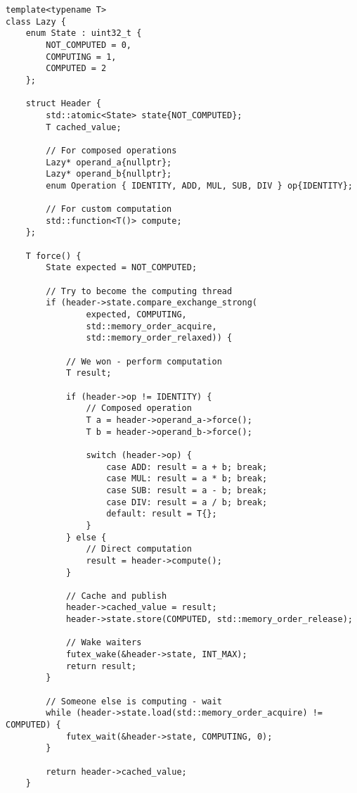 \documentclass[11pt]{article}
\begin{document}
\begin{lstlisting}[caption={Lazy Computation with Arithmetic Combinators}]
template<typename T>
class Lazy {
    enum State : uint32_t {
        NOT_COMPUTED = 0,
        COMPUTING = 1,
        COMPUTED = 2
    };
    
    struct Header {
        std::atomic<State> state{NOT_COMPUTED};
        T cached_value;
        
        // For composed operations
        Lazy* operand_a{nullptr};
        Lazy* operand_b{nullptr};
        enum Operation { IDENTITY, ADD, MUL, SUB, DIV } op{IDENTITY};
        
        // For custom computation
        std::function<T()> compute;
    };
    
    T force() {
        State expected = NOT_COMPUTED;
        
        // Try to become the computing thread
        if (header->state.compare_exchange_strong(
                expected, COMPUTING,
                std::memory_order_acquire,
                std::memory_order_relaxed)) {
            
            // We won - perform computation
            T result;
            
            if (header->op != IDENTITY) {
                // Composed operation
                T a = header->operand_a->force();
                T b = header->operand_b->force();
                
                switch (header->op) {
                    case ADD: result = a + b; break;
                    case MUL: result = a * b; break;
                    case SUB: result = a - b; break;
                    case DIV: result = a / b; break;
                    default: result = T{};
                }
            } else {
                // Direct computation
                result = header->compute();
            }
            
            // Cache and publish
            header->cached_value = result;
            header->state.store(COMPUTED, std::memory_order_release);
            
            // Wake waiters
            futex_wake(&header->state, INT_MAX);
            return result;
        }
        
        // Someone else is computing - wait
        while (header->state.load(std::memory_order_acquire) != COMPUTED) {
            futex_wait(&header->state, COMPUTING, 0);
        }
        
        return header->cached_value;
    }
    

\end{lstlisting}
\end{document}
